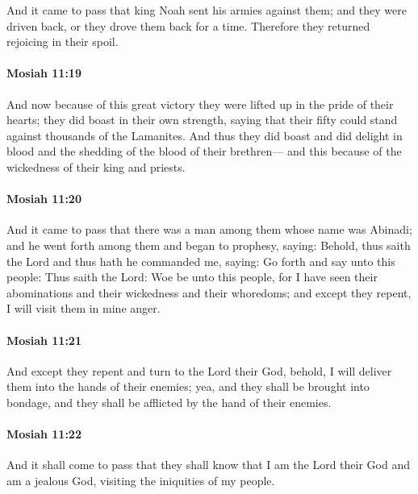 			And it came to pass that king Noah sent his armies against them;
			and they were driven back,
			or they drove them back for a time.
			Therefore they returned rejoicing in their spoil.

		\paragraph{Mosiah 11:19} %
			\label{MOSIAH-11-19}

			And now because of this great victory
			they were lifted up in the pride of their hearts;
			they did boast in their own strength,
			saying that their fifty could stand against thousands of the Lamanites.
			And thus they did boast and did delight
			in blood and the shedding of the blood of their brethren---
			and this because of the wickedness of their king and priests.

		\paragraph{Mosiah 11:20} %
			\label{MOSIAH-11-20}

			And it came to pass that there was a man among them whose name was Abinadi;
			and he went forth among them and began to prophesy, saying:
			Behold, thus saith the Lord and thus hath he commanded me, saying:
			Go forth and say unto this people:
			Thus saith the Lord:
			Woe be unto this people,
			for I have seen their abominations and their wickedness and their whoredoms;
			and except they repent, I will visit them in mine anger.

		\paragraph{Mosiah 11:21} %
			\label{MOSIAH-11-21}

			And except they repent and turn to the Lord their God,
			behold, I will deliver them into the hands of their enemies;
			yea, and they shall be brought into bondage,
			and they shall be afflicted by the hand of their enemies.

		\paragraph{Mosiah 11:22} %
			\label{MOSIAH-11-22}

			And it shall come to pass that they shall know
			that I am the Lord their God and am a jealous God,
			visiting the iniquities of my people.

